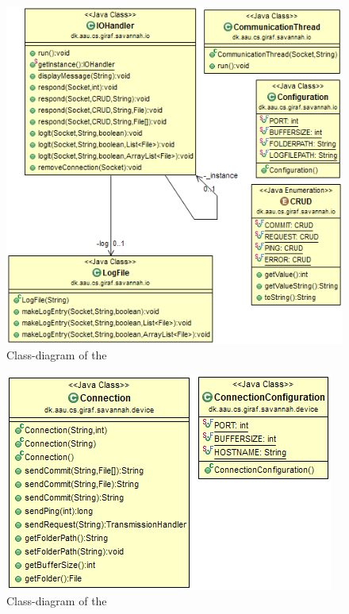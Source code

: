 
\begin{figure}[H]
	\centering
		\includegraphics[scale=0.70]{images/IOHandler.PNG}
	\caption{Class-diagram of the }
	\label{fig:app:IOHandler}
\end{figure}

\begin{figure}[H]
	\centering
		\includegraphics[scale=0.70]{images/Connection.PNG}
	\caption{Class-diagram of the }
	\label{fig:app:Connection}
\end{figure}

